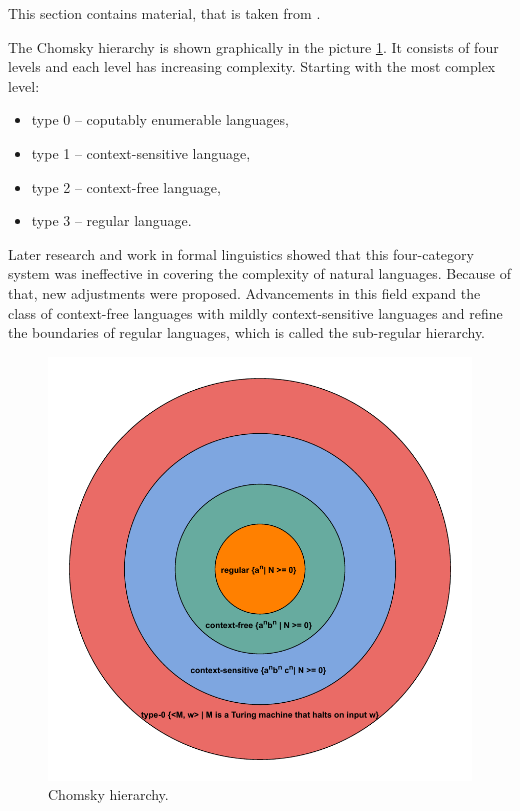 This section contains material, that is taken from \cite{FormalLanguageTheory}.

The Chomsky hierarchy is shown graphically in the picture \ref{fig:chomsky}. It consists of four levels and each level has increasing complexity. Starting with the most complex level:
\begin{itemize}
    \item{type 0 -- coputably enumerable languages,}
    \item{type 1 -- context-sensitive language,}
    \item{type 2 -- context-free language,}
    \item{type 3 -- regular language.}
\end{itemize}

Later research and work in formal linguistics showed that this four-category system was ineffective in covering the complexity of natural languages. Because of that, new adjustments were proposed. Advancements in this field expand the class of context-free languages with mildly context-sensitive languages and refine the boundaries of regular languages, which is called the sub-regular hierarchy.

\begin{figure}[H]
    \centering
    \includegraphics[scale=0.8]{obrazky-figures/chomsky.pdf}
    \caption{Chomsky hierarchy.}
    \label{fig:chomsky}
\end{figure}

